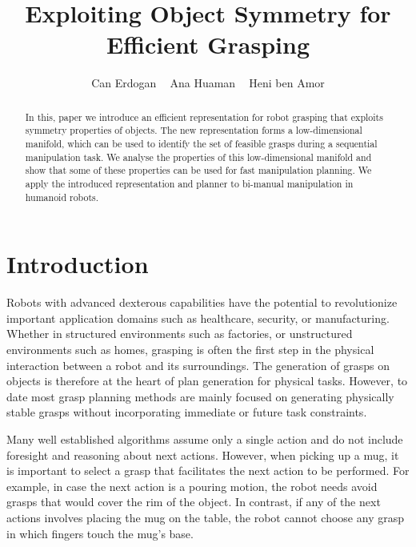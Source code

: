 \documentclass[a4paper,10pt,twocolumn]{article}
\begin{document}
\title{Exploiting Object Symmetry for Efficient Grasping}
\author{
Can Erdogan $\;\;$ Ana Huaman $\;\;$ Heni ben Amor
}

\newcommand{\vech}[1]{\textbf{#1}}
\newcommand{\set}[1]{\textbf{#1}}

\maketitle


\begin{abstract}
In this, paper we introduce an efficient representation for robot grasping that exploits symmetry
properties of objects. The new representation forms a low-dimensional manifold, which can be used to
identify the set of feasible grasps during a sequential manipulation task. We analyse the properties
of this low-dimensional manifold and show that some of these properties can be used for fast
manipulation planning. We apply the introduced representation and planner to bi-manual manipulation
in humanoid robots.
\end{abstract}

\section{Introduction}

Robots with advanced dexterous capabilities have the potential to revolutionize important
application domains such as healthcare, security, or manufacturing. Whether in structured
environments such as factories, or unstructured environments such as homes, grasping is often the
first step in the physical interaction between a robot and its surroundings. The generation of
grasps on objects is therefore at the heart of plan generation for physical tasks. However, to date most grasp
planning methods are mainly focused on generating physically stable grasps without incorporating
immediate or future task constraints. 

Many well established algorithms assume only a single action and do not include foresight and
reasoning about next actions. However, when picking up a mug, it is important to select a grasp that
facilitates the next action to be performed. For example, in case the next action is a pouring motion, the robot
needs avoid grasps that would cover the rim of the object. In contrast, if any of the next actions
involves placing the mug on the table, the robot cannot choose any grasp in which fingers touch the
mug's base. 
\end{document}

